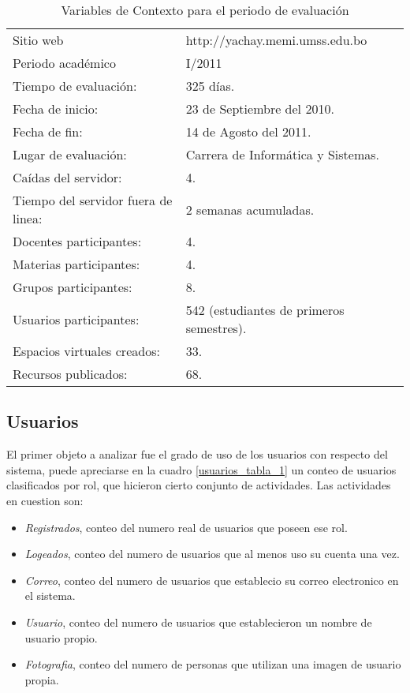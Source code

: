 \begin{table}
\centering
\begin{tabular}{l|l}
Sitio web                           & http://yachay.memi.umss.edu.bo\\
Periodo académico                   & I/2011\\
Tiempo de evaluación:               & 325 días.\\
Fecha de inicio:                    & 23 de Septiembre del 2010.\\
Fecha de fin:                       & 14 de Agosto del 2011.\\
Lugar de evaluación:                & Carrera de Informática y Sistemas.\\
Caídas del servidor:                & 4.\\
Tiempo del servidor fuera de linea: & 2 semanas acumuladas.\\
Docentes participantes:             & 4.\\
Materias participantes:             & 4.\\
Grupos participantes:               & 8.\\
Usuarios participantes:             & 542 (estudiantes de primeros semestres).\\
Espacios virtuales creados:         & 33.\\
Recursos publicados:                & 68.\\
\end{tabular}
\caption{Variables de Contexto para el periodo de evaluación}
\label{contexto}
\end{table}

\subsection{Usuarios}
El primer objeto a analizar fue el grado de uso de los usuarios con respecto del
sistema, puede apreciarse en la cuadro \ref{usuarios_tabla_1} un conteo de
usuarios clasificados por rol, que hicieron cierto conjunto de actividades. Las
actividades en cuestion son:

\begin{itemize}
\item \emph{Registrados}, conteo del numero real de usuarios que poseen ese rol.
\item \emph{Logeados}, conteo del numero de usuarios que al menos uso su cuenta
una vez.
\item \emph{Correo}, conteo del numero de usuarios que establecio su correo
electronico en el sistema.
\item \emph{Usuario}, conteo del numero de usuarios que establecieron un nombre
de usuario propio.
\item \emph{Fotografia}, conteo del numero de personas que utilizan una imagen
de usuario propia.
\end{itemize}

